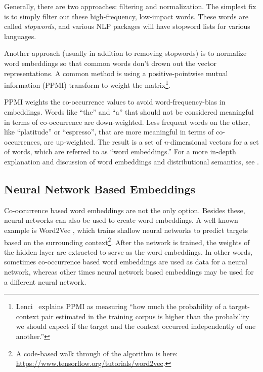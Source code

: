 Generally, there are two approaches: filtering and normalization. The simplest fix is to simply filter out these high-frequency, low-impact words. These words are called  \emph{stopwords}, and various NLP packages will have stopword lists for various languages.

Another approach (usually in addition to removing stopwords) is to normalize word embeddings so that common words don't drown out the vector representations. A common method is using a positive-pointwise mutual information (PPMI) transform to weight the matrix\footnote{ Lenci~\cite{lenci2018distributional} explains PPMI as measuring ``how much the probability of a target-context pair estimated in the training corpus is higher than the probability we should expect if the target and the context occurred independently of one another.''}.

PPMI weights the co-occurrence values to avoid word-frequency-bias in embeddings. Words like ``the'' and ``a'' that should not be considered meaningful in terms of co-occurrence are down-weighted. Less frequent words on the other, like ``platitude'' or ``espresso'', that are more meaningful in terms of co-occurrences, are up-weighted. The result is a set of \textit{n}-dimensional vectors for a set of words, which are referred to as ``word embeddings.'' For a more in-depth explanation and discussion of word embeddings and distributional semantics, see \cite{lenci2018distributional}.

\subsection{Neural Network Based Embeddings}

Co-occurrence based word embeddings are not the only option. Besides these, neural networks can also be used to create word embeddings. A well-known example is Word2Vec \cite{mikolov2013distributed}, which trains shallow neural networks to predict targets based on the surrounding context\footnote{A code-based walk through of the algorithm is here:  \url{https://www.tensorflow.org/tutorials/word2vec}.}. After the network is trained, the weights of the hidden layer are extracted to serve as the word embeddings. In other words, sometimes co-occurrence based word embeddings are used as data for a neural network, whereas other times neural network based embeddings may be used for a different neural network.


